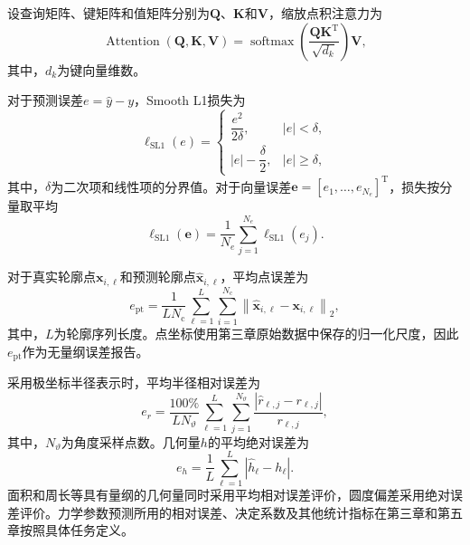 设查询矩阵、键矩阵和值矩阵分别为$\boldsymbol{Q}$、$\boldsymbol{K}$和$\boldsymbol{V}$，缩放点积注意力为
\begin{equation}
\operatorname{Attention}(\boldsymbol{Q},\boldsymbol{K},\boldsymbol{V})
=
\operatorname{softmax}\left(
\frac{\boldsymbol{Q}\boldsymbol{K}^{\mathrm T}}{\sqrt{d_k}}
\right)\boldsymbol{V},
\label{eq:ch2_attention}
\end{equation}
其中，$d_k$为键向量维数\cite{vaswani2017attention}。

对于预测误差$e=\widehat y-y$，Smooth L1损失为
\begin{equation}
\ell_{\mathrm{SL1}}(e)
=
\begin{cases}
\dfrac{e^2}{2\delta}, & |e|<\delta,\\[5pt]
|e|-\dfrac{\delta}{2}, & |e|\geq\delta,
\end{cases}
\label{eq:ch2_smooth_l1}
\end{equation}
其中，$\delta$为二次项和线性项的分界值。对于向量误差$\boldsymbol{e}=[e_1,\ldots,e_{N_e}]^{\mathrm T}$，损失按分量取平均
\begin{equation}
\ell_{\mathrm{SL1}}(\boldsymbol{e})
=
\frac{1}{N_e}
\sum_{j=1}^{N_e}
\ell_{\mathrm{SL1}}(e_j).
\label{eq:ch2_smooth_l1_vector}
\end{equation}

对于真实轮廓点$\boldsymbol{x}_{i,\ell}$和预测轮廓点$\widehat{\boldsymbol{x}}_{i,\ell}$，平均点误差为
\begin{equation}
e_{\mathrm{pt}}
=
\frac{1}{LN_{\mathrm c}}
\sum_{\ell=1}^{L}
\sum_{i=1}^{N_{\mathrm c}}
\left\|
\widehat{\boldsymbol{x}}_{i,\ell}
-
\boldsymbol{x}_{i,\ell}
\right\|_2,
\label{eq:ch2_point_error}
\end{equation}
其中，$L$为轮廓序列长度。点坐标使用第三章原始数据中保存的归一化尺度，因此$e_{\mathrm{pt}}$作为无量纲误差报告。

采用极坐标半径表示时，平均半径相对误差为
\begin{equation}
e_r
=
\frac{100\%}{LN_{\vartheta}}
\sum_{\ell=1}^{L}
\sum_{j=1}^{N_{\vartheta}}
\frac{\left|\widehat r_{\ell,j}-r_{\ell,j}\right|}{r_{\ell,j}},
\label{eq:ch2_radius_relative_error}
\end{equation}
其中，$N_{\vartheta}$为角度采样点数。几何量$h$的平均绝对误差为
\begin{equation}
e_h
=
\frac{1}{L}
\sum_{\ell=1}^{L}
\left|\widehat h_{\ell}-h_{\ell}\right|.
\label{eq:ch2_geometry_error}
\end{equation}
面积和周长等具有量纲的几何量同时采用平均相对误差评价，圆度偏差采用绝对误差评价。力学参数预测所用的相对误差、决定系数及其他统计指标在第三章和第五章按照具体任务定义。

